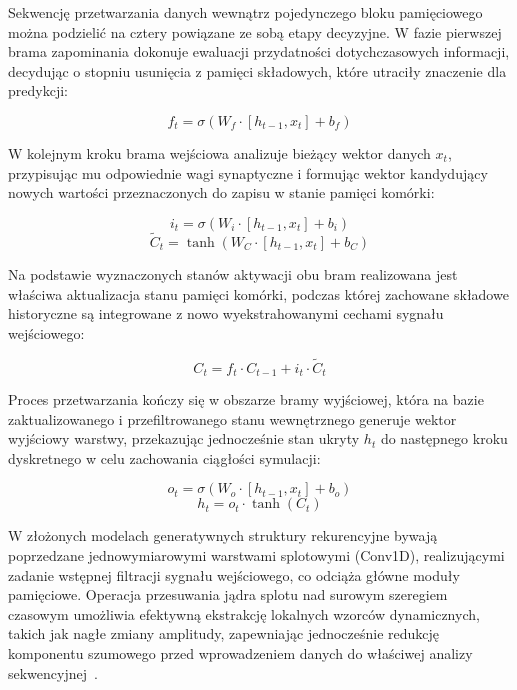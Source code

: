 Sekwencję przetwarzania danych wewnątrz pojedynczego bloku pamięciowego można podzielić na cztery powiązane ze sobą etapy decyzyjne. W fazie pierwszej brama zapominania dokonuje ewaluacji przydatności dotychczasowych informacji, decydując o stopniu usunięcia z pamięci składowych, które utraciły znaczenie dla predykcji:
 
\begin{equation}
    f_t = \sigma(W_f \cdot [h_{t-1}, x_t] + b_f)
\end{equation}
 
W kolejnym kroku brama wejściowa analizuje bieżący wektor danych $x_t$, przypisując mu odpowiednie wagi synaptyczne i formując wektor kandydujący nowych wartości przeznaczonych do zapisu w stanie pamięci komórki:
 
\begin{equation}
    i_t = \sigma(W_i \cdot [h_{t-1}, x_t] + b_i)
\end{equation}
\begin{equation}
    \tilde{C}_t = \tanh(W_C \cdot [h_{t-1}, x_t] + b_C)
\end{equation}
 
Na podstawie wyznaczonych stanów aktywacji obu bram realizowana jest właściwa aktualizacja stanu pamięci komórki, podczas której zachowane składowe historyczne są integrowane z nowo wyekstrahowanymi cechami sygnału wejściowego:
 
\begin{equation}
    C_t = f_t \cdot C_{t-1} + i_t \cdot \tilde{C}_t
\end{equation}
 
Proces przetwarzania kończy się w obszarze bramy wyjściowej, która na bazie zaktualizowanego i przefiltrowanego stanu wewnętrznego generuje wektor wyjściowy warstwy, przekazując jednocześnie stan ukryty $h_t$ do następnego kroku dyskretnego w celu zachowania ciągłości symulacji:
 
\begin{equation}
    o_t = \sigma(W_o \cdot [h_{t-1}, x_t] + b_o)
\end{equation}
\begin{equation}
    h_t = o_t \cdot \tanh(C_t)
\end{equation}
 
W złożonych modelach generatywnych struktury rekurencyjne bywają poprzedzane jednowymiarowymi warstwami splotowymi (Conv1D), realizującymi zadanie wstępnej filtracji sygnału wejściowego, co odciąża główne moduły pamięciowe. Operacja przesuwania jądra splotu nad surowym szeregiem czasowym umożliwia efektywną ekstrakcję lokalnych wzorców dynamicznych, takich jak nagłe zmiany amplitudy, zapewniając jednocześnie redukcję komponentu szumowego przed wprowadzeniem danych do właściwej analizy sekwencyjnej~\cite{goodfellow2016deep, Conv1DLSTM2, Conv1DLSTM}.



















